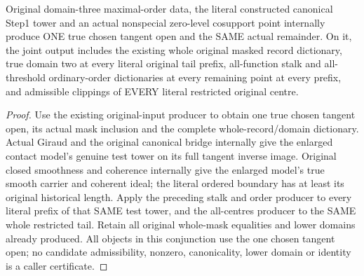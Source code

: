 \begin{theorem}
\label{hir:zero-contact-original-clipped-centres}
\leanok
{}
Original domain-three maximal-order data, the literal constructed canonical
Step1 tower and an actual nonspecial zero-level cosupport point internally
produce ONE true chosen tangent open and the SAME actual remainder. On it,
the joint output includes the existing whole original masked record dictionary,
true domain two at every literal original tail prefix, all-function stalk and
all-threshold ordinary-order dictionaries at every remaining point at every
prefix, and admissible clippings of EVERY literal restricted original centre.
\end{theorem}
\begin{proof}
Use the existing original-input producer to obtain one true chosen tangent
open, its actual mask inclusion and the complete whole-record/domain
dictionary. Actual Giraud and the original canonical bridge internally give
the enlarged contact model's genuine test tower on its full tangent inverse
image. Original closed smoothness and coherence internally give the enlarged
model's true smooth carrier and coherent ideal; the literal ordered boundary
has at least its original historical length. Apply the preceding stalk and
order producer to every literal prefix of that SAME test tower, and the
all-centres producer to the SAME whole restricted tail. Retain all original
whole-mask equalities and lower domains already produced. All objects in
this conjunction use the one chosen tangent open; no candidate admissibility,
nonzero, canonicality, lower domain or identity is a caller certificate.
\end{proof}

